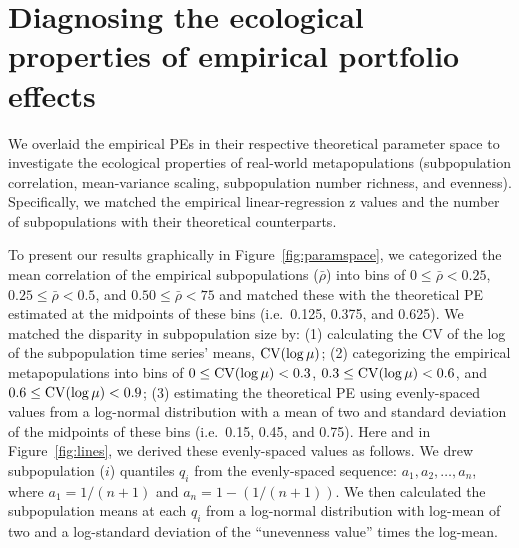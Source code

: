 \section{Diagnosing the ecological properties of empirical portfolio effects}

We overlaid the empirical PEs in their respective theoretical parameter space
to investigate the ecological properties of real-world metapopulations
(subpopulation correlation, mean-variance scaling, subpopulation number
richness, and evenness). Specifically, we matched the empirical
linear-regression z values and the number of subpopulations with their
theoretical counterparts.

To present our results graphically in Figure~\ref{fig:paramspace}, we categorized
the mean correlation of the empirical subpopulations ($\bar{\rho}$) into bins of
$0 \le \bar{\rho} < 0.25$, $0.25 \le \bar{\rho} < 0.5$, and $0.50 \le \bar{\rho}
< 75$ and matched these with the theoretical PE estimated at the midpoints of
these bins (i.e.\ 0.125, 0.375, and 0.625).  We matched the disparity in
subpopulation size by: (1) calculating the CV of the log of the subpopulation
time series' means, $\mathrm{CV}(\log\mu)$; (2) categorizing the empirical
metapopulations into bins of $0 \le \mathrm{CV}(\log\mu) < 0.3$, $0.3 \le \mathrm{CV}(\log\mu) <
0.6$, and $0.6 \le \mathrm{CV}(\log\mu) < 0.9$; (3) estimating the theoretical PE using
evenly-spaced values from a log-normal distribution with a mean of two and
standard deviation of the midpoints of these bins (i.e.\ 0.15, 0.45, and 0.75).
Here and in Figure~\ref{fig:lines}, we derived these evenly-spaced values as
follows.
We drew subpopulation ($i$) quantiles $q_i$ from the evenly-spaced sequence:
$a_1, a_2, \ldots, a_n$, where $a_1 = 1/(n+1)$ and $a_n = 1-(1/(n+1))$. We then
calculated the subpopulation means at each $q_i$ from a log-normal distribution
with log-mean of two and a log-standard deviation of the ``unevenness value''
times the log-mean.



\clearpage



\begin{landscape}


  
\end{landscape}
\clearpage

